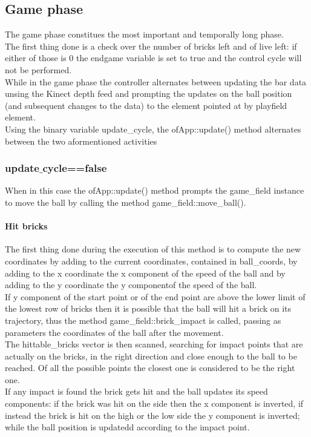 \documentclass[]{article}
\begin{document}
\subsection{Game phase}
The game phase constitues the most important and temporally long phase.\\
The first thing done is a check over the number of bricks left and of live left: if either of those is 0 the endgame variable is set to true and the control cycle will not be performed.\\
While in the game phase the controller alternates between updating the bar data unsing the Kinect depth feed and prompting the updates on the ball position (and subsequent changes to the data) to the element pointed at by playfield element.\\
Using the binary variable update\_cycle, the ofApp::update() method alternates between the two aformentioned activities
\subsubsection{update$\_$cycle==false}
When in this case the ofApp::update() method prompts the game\_field instance to move the ball by calling the method game\_field::move\_ball().\\
\paragraph{Hit bricks}
The first thing done during the execution of this method is to compute the new coordinates by adding to the current coordinates, contained in ball\_coords, by adding to the x coordinate the x component of the speed of the ball and by adding to the y coordinate the y componentof the speed of the ball.\\
If y component of the start point or of the end point are above the lower limit of the lowest row of bricks then it is possible that the ball will hit a brick on its trajectory, thus the method game\_field::brick\_impact is called, passing as parameters the coordinates of the ball after the movement.\\
The hittable\_bricks vector is then scanned, searching for impact points that are actually on the bricks, in the right direction and close enough to the ball to be reached. Of all the possible points the closest one is considered to be the right one.\\
If any impact is found the brick gets hit and the ball updates its speed components: if the brick was hit on the side then the x component is inverted, if instead the brick is hit on the high or the low side the y component is inverted; while the ball position is updatedd according to the impact point.\\
\end{document}
